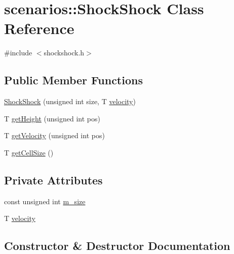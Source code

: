 \hypertarget{classscenarios_1_1ShockShock}{}\section{scenarios\+:\+:Shock\+Shock Class Reference}
\label{classscenarios_1_1ShockShock}


{\ttfamily \#include $<$shockshock.\+h$>$}

\subsection*{Public Member Functions}
\begin{DoxyCompactItemize}
\item 
\hyperlink{classscenarios_1_1ShockShock_a228368994c899142132fb9cfc4ed2691}{Shock\+Shock} (unsigned int size, T \hyperlink{classscenarios_1_1ShockShock_af2d811a5adab6c170e7666e26a7dedad}{velocity})
\item 
T \hyperlink{classscenarios_1_1ShockShock_a7b9e4cef9900e981fa9b634ee9d6b0ff}{get\+Height} (unsigned int pos)
\item 
T \hyperlink{classscenarios_1_1ShockShock_afa7ba0c8aec3c27dd2cddbe12a1bc7e9}{get\+Velocity} (unsigned int pos)
\item 
T \hyperlink{classscenarios_1_1ShockShock_a5d21aae3177a5b2279cc79133f082e30}{get\+Cell\+Size} ()
\end{DoxyCompactItemize}
\subsection*{Private Attributes}
\begin{DoxyCompactItemize}
\item 
const unsigned int \hyperlink{classscenarios_1_1ShockShock_a0c230f6307041c3a79d3c78466320050}{m\+\_\+size}
\item 
T \hyperlink{classscenarios_1_1ShockShock_af2d811a5adab6c170e7666e26a7dedad}{velocity}
\end{DoxyCompactItemize}


\subsection{Constructor \& Destructor Documentation}
\hypertarget{classscenarios_1_1ShockShock_a228368994c899142132fb9cfc4ed2691}{}
